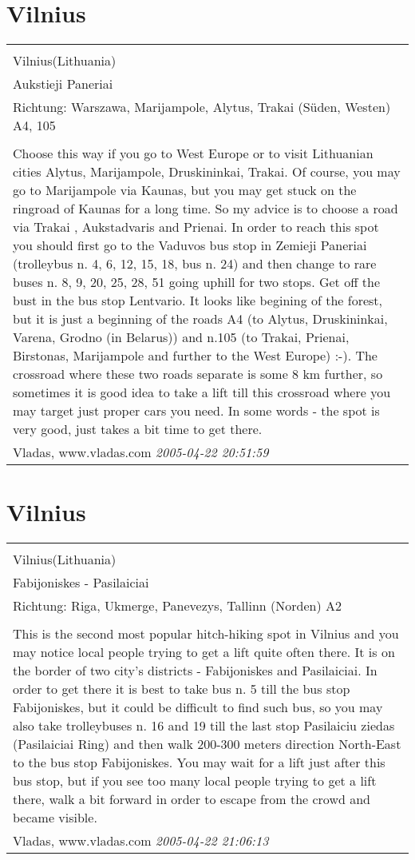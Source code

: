 \documentclass[a4paper,12pt]{article}
\begin{document}
\section{Vilnius}
\begin{tabular}{|p{13cm}|}
\hline\\
Vilnius(Lithuania)\\
Aukstieji Paneriai\\
Richtung: Warszawa, Marijampole, Alytus, Trakai (Süden, Westen) A4, 105 \\
\hline\\
Choose this way if you go to West Europe or to visit Lithuanian cities Alytus, Marijampole, Druskininkai, Trakai. Of course, you may go to Marijampole via Kaunas, but you may get stuck on the ringroad of Kaunas for a long time. So my advice is to choose a road via Trakai , Aukstadvaris and Prienai.
In order to reach this spot you should first go to the Vaduvos bus stop in Zemieji Paneriai (trolleybus n. 4, 6, 12, 15, 18, bus n. 24) and then change to rare buses n. 8, 9, 20, 25, 28, 51 going uphill for two stops. Get off the bust in the bus stop Lentvario. It looks like begining of the forest, but it is just a beginning of the roads A4 (to Alytus, Druskininkai, Varena, Grodno (in Belarus)) and n.105 (to Trakai, Prienai, Birstonas, Marijampole and further to the West Europe) :-). The crossroad where these two roads separate is some 8 km further, so sometimes it is good idea to take a lift till this crossroad where you may target just proper cars you need.
In some words - the spot is very good, just takes a bit time to get there. \\
Vladas, www.vladas.com \textit{ 2005-04-22 20:51:59 }\\\hline
\end{tabular}


\section{Vilnius}
\begin{tabular}{|p{13cm}|}
\hline\\
Vilnius(Lithuania)\\
Fabijoniskes - Pasilaiciai\\
Richtung: Riga, Ukmerge, Panevezys, Tallinn (Norden) A2 \\
\hline\\
This is the second most popular hitch-hiking spot in Vilnius and you may notice local people trying to get a lift quite often there. It is on the border of two city's districts - Fabijoniskes and Pasilaiciai.
In order to get there it is best to take bus n. 5 till the bus stop Fabijoniskes, but it could be difficult to find such bus, so you may also take trolleybuses n. 16 and 19 till the last stop Pasilaiciu ziedas (Pasilaiciai Ring) and then walk 200-300 meters direction North-East to the bus stop Fabijoniskes.
You may wait for a lift just after this bus stop, but if you see too many local people trying to get a lift there, walk a bit forward in order to escape from the crowd and became visible. \\
Vladas, www.vladas.com \textit{ 2005-04-22 21:06:13 }\\\hline
\end{tabular}
\end{document}
